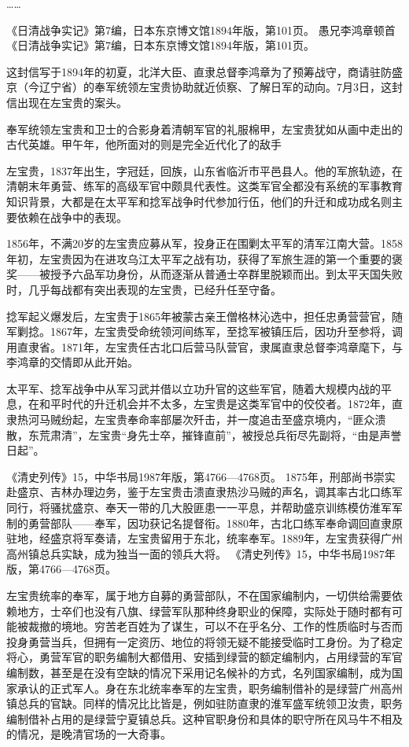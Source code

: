 \documentclass[12pt,UTF8]{ctexbook}
\begin{document}
……

《日清战争实记》第7编，日本东京博文馆1894年版，第101页。
愚兄李鸿章顿首 《日清战争实记》第7编，日本东京博文馆1894年版，第101页。

这封信写于1894年的初夏，北洋大臣、直隶总督李鸿章为了预筹战守，商请驻防盛京（今辽宁省）的奉军统领左宝贵协助就近侦察、了解日军的动向。7月3日，这封信出现在左宝贵的案头。


奉军统领左宝贵和卫士的合影身着清朝军官的礼服棉甲，左宝贵犹如从画中走出的古代英雄。甲午年，他所面对的则是完全近代化了的敌手

左宝贵，1837年出生，字冠廷，回族，山东省临沂市平邑县人。他的军旅轨迹，在清朝末年勇营、练军的高级军官中颇具代表性。这类军官全都没有系统的军事教育知识背景，大都是在太平军和捻军战争时代参加行伍，他们的升迁和成功成名则主要依赖在战争中的表现。

1856年，不满20岁的左宝贵应募从军，投身正在围剿太平军的清军江南大营。1858年初，左宝贵因为在进攻乌江太平军之战有功，获得了军旅生涯的第一个重要的褒奖——被授予六品军功身份，从而逐渐从普通士卒群里脱颖而出。到太平天国失败时，几乎每战都有突出表现的左宝贵，已经升任至守备。

捻军起义爆发后，左宝贵于1865年被蒙古亲王僧格林沁选中，担任忠勇营营官，随军剿捻。1867年，左宝贵受命统领河间练军，至捻军被镇压后，因功升至参将，调用直隶省。1871年，左宝贵任古北口后营马队营官，隶属直隶总督李鸿章麾下，与李鸿章的交情即从此开始。

太平军、捻军战争中从军习武并借以立功升官的这些军官，随着大规模内战的平息，在和平时代的升迁机会并不太多，左宝贵是这类军官中的佼佼者。1872年，直隶热河马贼纷起，左宝贵奉命率部屡次歼击，并一度追击至盛京境内，“匪众溃散，东荒肃清”，左宝贵“身先士卒，摧锋直前”，被授总兵衔尽先副将，“由是声誉日起”。

《清史列传》15，中华书局1987年版，第4766—4768页。
1875年，刑部尚书崇实赴盛京、吉林办理边务，鉴于左宝贵击溃直隶热沙马贼的声名，调其率古北口练军同行，将骚扰盛京、奉天一带的几大股匪患一一平息，并帮助盛京训练模仿淮军军制的勇营部队——奉军，因功获记名提督衔。1880年，古北口练军奉命调回直隶原驻地，经盛京将军奏请，左宝贵留用于东北，统率奉军。1889年，左宝贵获得广州高州镇总兵实缺，成为独当一面的领兵大将。 《清史列传》15，中华书局1987年版，第4766—4768页。

左宝贵统率的奉军，属于地方自募的勇营部队，不在国家编制内，一切供给需要依赖地方，士卒们也没有八旗、绿营军队那种终身职业的保障，实际处于随时都有可能被裁撤的境地。穷苦老百姓为了谋生，可以不在乎名分、工作的性质临时与否而投身勇营当兵，但拥有一定资历、地位的将领无疑不能接受临时工身份。为了稳定将心，勇营军官的职务编制大都借用、安插到绿营的额定编制内，占用绿营的军官编制数，甚至是在没有空缺的情况下采用记名候补的方式，名列国家编制，成为国家承认的正式军人。身在东北统率奉军的左宝贵，职务编制借补的是绿营广州高州镇总兵的官缺。同样的情况比比皆是，例如驻防直隶的淮军盛军统领卫汝贵，职务编制借补占用的是绿营宁夏镇总兵。这种官职身份和具体的职守所在风马牛不相及的情况，是晚清官场的一大奇事。
\end{document}

